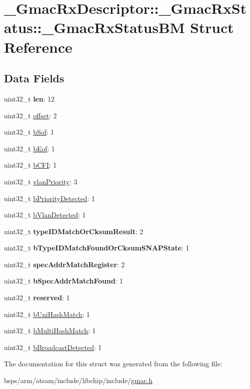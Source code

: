 \hypertarget{struct__GmacRxDescriptor_1_1__GmacRxStatus_1_1__GmacRxStatusBM}{}\section{\+\_\+\+Gmac\+Rx\+Descriptor\+::\+\_\+\+Gmac\+Rx\+Status\+::\+\_\+\+Gmac\+Rx\+Status\+BM Struct Reference}
\label{struct__GmacRxDescriptor_1_1__GmacRxStatus_1_1__GmacRxStatusBM}
\subsection*{Data Fields}
\begin{DoxyCompactItemize}
\item 
uint32\+\_\+t {\bfseries len}\+: 12
\item 
uint32\+\_\+t \mbox{\hyperlink{group__gmac__defines_gab38a4fb2bdc30d8e44568cbe573cc6ca}{offset}}\+: 2
\item 
uint32\+\_\+t \mbox{\hyperlink{group__gmac__defines_ga7026ef3a4c69489e2698efc5887cfcd1}{b\+Sof}}\+: 1
\item 
uint32\+\_\+t \mbox{\hyperlink{group__gmac__defines_ga650b2f5822144700bc1e625d9349e768}{b\+Eof}}\+: 1
\item 
uint32\+\_\+t \mbox{\hyperlink{group__gmac__defines_ga614ebbda15781fa167acefa95bf80968}{b\+C\+FI}}\+: 1
\item 
uint32\+\_\+t \mbox{\hyperlink{group__gmac__defines_ga95d12d896b178ea460ee0350114d04f4}{vlan\+Priority}}\+: 3
\item 
uint32\+\_\+t \mbox{\hyperlink{group__gmac__defines_ga0ab37f6aeafe77aaef506cc23e023a3d}{b\+Priority\+Detected}}\+: 1
\item 
uint32\+\_\+t \mbox{\hyperlink{group__gmac__defines_ga8caa121d2ce4282773dfb84e332afbf1}{b\+Vlan\+Detected}}\+: 1
\item 
uint32\+\_\+t {\bfseries type\+I\+D\+Match\+Or\+Cksum\+Result}\+: 2
\item 
uint32\+\_\+t {\bfseries b\+Type\+I\+D\+Match\+Found\+Or\+Cksum\+S\+N\+A\+P\+State}\+: 1
\item 
uint32\+\_\+t {\bfseries spec\+Addr\+Match\+Register}\+: 2
\item 
uint32\+\_\+t {\bfseries b\+Spec\+Addr\+Match\+Found}\+: 1
\item 
uint32\+\_\+t {\bfseries reserved}\+: 1
\item 
uint32\+\_\+t \mbox{\hyperlink{group__gmac__defines_ga15f690063c4de67bb75d99a78ce9ed77}{b\+Uni\+Hash\+Match}}\+: 1
\item 
uint32\+\_\+t \mbox{\hyperlink{group__gmac__defines_gabce6f7c6f0579197591a3e606dfe292f}{b\+Multi\+Hash\+Match}}\+: 1
\item 
uint32\+\_\+t \mbox{\hyperlink{group__gmac__defines_ga7384907699406fb05731360bdfc7866c}{b\+Broadcast\+Detected}}\+: 1
\end{DoxyCompactItemize}


The documentation for this struct was generated from the following file\+:\begin{DoxyCompactItemize}
\item 
bsps/arm/atsam/include/libchip/include/\mbox{\hyperlink{gmac_8h}{gmac.\+h}}\end{DoxyCompactItemize}
